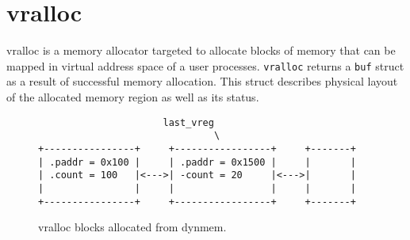\chapter{vralloc}

\acf{vralloc} is a memory allocator targeted to allocate blocks of memory
that can be mapped in virtual address space of a user processes.
\verb+vralloc+ returns a \verb+buf+ struct as a result of successful memory
allocation. This struct describes physical layout of the allocated
memory region as well as its status.



\begin{figure}
\begin{verbatim}
                      last_vreg
                               \
+----------------+     +-----------------+     +-------+
| .paddr = 0x100 |     | .paddr = 0x1500 |     |       |
| .count = 100   |<--->| -count = 20     |<--->|       |
|                |     |                 |     |       |
+----------------+     +-----------------+     +-------+
\end{verbatim}
\caption{vralloc blocks allocated from dynmem.}
\label{figure:vralloc_blocks}
\end{figure}
